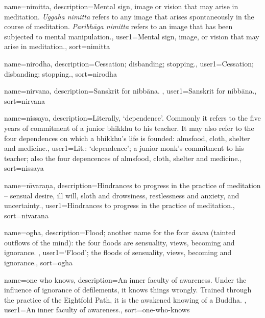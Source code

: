 {
name={nimitta},
description={Mental sign, image or vision that may arise in meditation. \textit{Uggaha nimitta} refers to any image that arises spontaneously in the course of meditation. \textit{Paribh\=aga nimitta} refers to an image that has been subjected to mental manipulation.},
user1={Mental sign, image, or vision that may arise in meditation.},
sort={nimitta}
}

{
name={nirodha},
description={Cessation; disbanding; stopping.},
user1={Cessation; disbanding; stopping.},
sort={nirodha}
}

{
name=nirvana,
description={Sanskrit for nibb\=ana. \protect \seepre %
\protect {}%
\protect \seepost %
},
user1={Sanskrit for nibb\=ana.},
sort={nirvana}
}

{
name=nissaya,
description={Literally, `dependence'. Commonly it refers to the five years of commitment of a junior bhikkhu to his teacher. It may also refer to the four dependences on which a bhikkhu's life is founded: almsfood, cloth, shelter and medicine.},
user1={Lit.: `dependence'; a junior monk's commitment to his teacher; also the four depencences of almsfood, cloth, shelter and medicine.},
sort={nissaya}
}

{
name={n\={\i}vara\d{n}a},
description={Hindrances to progress in the practice of meditation -- sensual desire, ill will, sloth and drowsiness, restlessness and anxiety, and uncertainty.},
user1={Hindrances to progress in the practice of meditation.},
sort={nivarana}
}

{
name=ogha,
description={Flood; another name for the four \textit{\=asava} (tainted outflows of the mind): the four floods are sensuality, views, becoming and ignorance. \protect \seepre %
\protect {}%
\protect \seepost %
},
user1={`Flood'; the floods of sensuality, views, becoming and ignorance.},
sort={ogha}
}

{
name={one who knows},
description={An inner faculty of awareness. Under the influence of ignorance of defilements, it knows things wrongly.  Trained through the practice of the Eightfold Path, it is the awakened knowing of a Buddha. \protect \seepre %
\protect {}%
\protect \seepost %
},
user1={An inner faculty of awareness.},
sort={one-who-knows}
}

